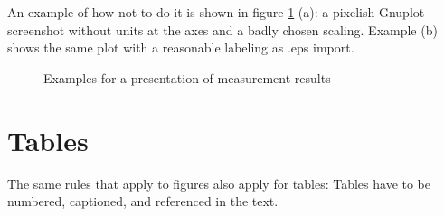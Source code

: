 An example of how not to do it is shown in figure \ref{fig:plots} (a): a pixelish Gnuplot-screenshot
without units at the axes and a badly chosen scaling. Example (b) shows the same plot with
a reasonable labeling as .eps import.

\begin{figure}[htbp]
  \begin{center}
    \caption{Examples for a presentation of measurement results}
    \label{fig:plots}
  \end{center}
\end{figure}


\section{Tables}

The same rules that apply to figures also apply for tables:
Tables have to be numbered, captioned, and referenced in the text.


